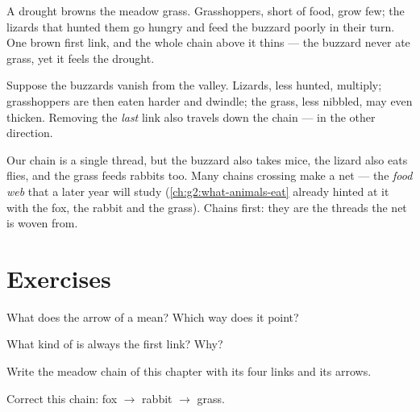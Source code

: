\begin{example}\label{ex:g3:food-chains:dry}
A drought browns the meadow grass. Grasshoppers, short of food,
grow few; the lizards that hunted them go hungry and feed the
buzzard poorly in their turn. One brown first link, and the
whole chain above it thins --- the buzzard never ate grass, yet
it feels the drought.
\end{example}

\begin{example}\label{ex:g3:food-chains:hunter}
Suppose the buzzards vanish from the valley. Lizards, less
hunted, multiply; grasshoppers are then eaten harder and
dwindle; the grass, less nibbled, may even thicken. Removing
the \emph{last} link also travels down the chain --- in the
other direction.
\end{example}

\begin{remark}\label{rem:g3:food-chains:web}
Our chain is a single thread, but the buzzard also takes mice,
the lizard also eats flies, and the grass feeds rabbits too.
Many chains crossing make a net --- the \emph{food web} that a
later year will study
(\cref{ch:g2:what-animals-eat} already hinted at it with the
fox, the rabbit and the grass). Chains first: they are the
threads the net is woven from.
\end{remark}

\section{Exercises}

\begin{exercise}[$\star$]\label{exo:g3:food-chains:1}
What does the arrow of a  mean? Which way does it
point?
\end{exercise}

\begin{exercise}[$\star$]\label{exo:g3:food-chains:2}
What kind of  is always the first link? Why?
\end{exercise}

\begin{exercise}[$\star$]\label{exo:g3:food-chains:3}
Write the meadow chain of this chapter with its four links and
its arrows.
\end{exercise}

\begin{exercise}[$\star$]\label{exo:g3:food-chains:4}
Correct this chain: fox $\rightarrow$ rabbit $\rightarrow$
grass.
\end{exercise}

